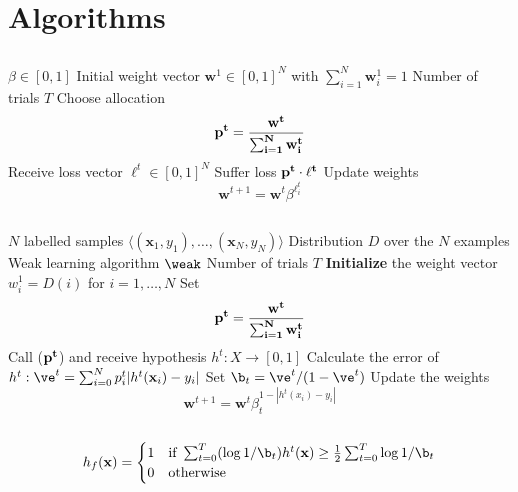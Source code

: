 
\chapter{Algorithms}
\label{app:algo}

\section{\hedge}
\label{app:hedge}

\begin{algorithm}
\caption{\hedge}
\begin{algorithmic}[1]
\Require 
\Statex $\beta\in [0,1]$
\Statex Initial weight vector $\mathbf{w}^1\in [0,1]^N$ with $\sum_{i=1}^N \mathbf{w}^1_i=1$
\Statex Number of trials $T$
\State Choose allocation $$\bf p^t= \frac{\bf w^t}{\sum_{i=1}^N w^t_i}$$
\State Receive loss vector $\ell^t\in[0,1]^N$
\State Suffer loss $\bf p^t\cdot \ell^t$
\State Update weights $$\mathbf{w}^{t+1}=\mathbf{w}^t\beta^{\ell_{i}^{t}}$$
\EndFor
\EndProcedure
\end{algorithmic}
\end{algorithm}
\newpage
\section{\adaB}
\label{app:adaB}

\begin{algorithm} 
\caption{\adaB}
\begin{algorithmic}[1]
\Require 
\Statex $N$ labelled samples $\langle (\mathbf x_1,y_1),\ldots,(\mathbf x_N,y_N)\rangle$
\Statex Distribution $D$ over the $N$ examples
\Statex Weak learning algorithm $\weak$
\Statex Number of trials $T$
\State \textbf{Initialize} the weight vector $w_i^1=D(i)$ for $i=1,\ldots,N$
\State Set $$\bf p^t= \frac{\bf w^t}{\sum_{i=1}^N w^t_i}$$
\State Call \weak($\bf p^t$) and receive hypothesis $h^t:X\to [0,1]$
\State Calculate the error of $h^t:\ve^t=\sum^N_{i=0}p^t_i|h^t(\mathbf x_i)-y_i|$
\State Set $\b_t=\ve^t/(1-\ve^t)$
\State Update the weights $$\mathbf{w}^{t+1}=\mathbf{w}^t\beta^{1-|h^t(x_i)-y_i|}_t$$
\EndFor\\
\Return $$h_f(\mathbf x)=\begin{cases}1 & \text{if } \sum^T_{t=0}(\log1/\b_t)h^t(\mathbf x)\geq\frac12\sum^T_{t=0}\log1/\b_t\\0&\text{otherwise}\end{cases}$$
\EndProcedure
\end{algorithmic}
\end{algorithm}

